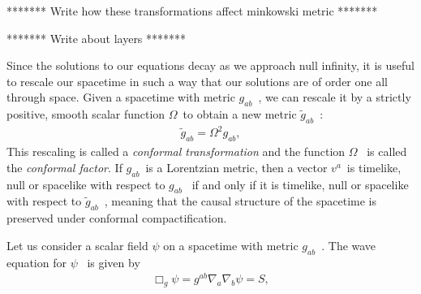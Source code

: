******* Write how these transformations affect minkowski metric *******

******* Write about layers *******

Since the solutions to our equations decay as we approach null infinity, it is useful to rescale our spacetime in such a way that our solutions are of order one all through space. Given a spacetime with metric $g_{ab}$~, we can rescale it by a strictly positive, smooth scalar function $\Omega$~to obtain a new metric $\tilde{g}_{ab}$~:
%
\begin{align}
    \tilde{g}_{ab} 
    = \Omega^2 g_{ab},
\end{align}
%
This rescaling is called a \textit{conformal transformation} and the function $\Omega$~ is called the \textit{conformal factor}. If $g_{ab}$~is a Lorentzian metric, then a vector $v^a$~is timelike, null or spacelike with respect to $g_{ab}$~ if and only if it is timelike, null or spacelike with respect to $\tilde{g}_{ab}$~, meaning that the causal structure of the spacetime is preserved under conformal compactification. 

Let us consider a scalar field $\psi$ on a spacetime with metric $g_{ab}$~. The wave equation for $\psi$~ is given by
%
\begin{align}
    \Box_g \psi 
    = g^{ab} \nabla_a \nabla_b \psi 
    = S,
    \label{eq:wave_equation}
\end{align}

